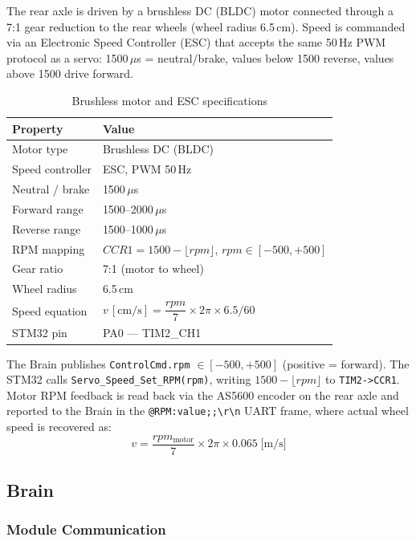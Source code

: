 \documentclass[12pt,a4paper]{article}
\begin{document}
The rear axle is driven by a brushless DC (BLDC) motor connected through a
7:1 gear reduction to the rear wheels (wheel radius 6.5\,cm).
Speed is commanded via an Electronic Speed Controller (ESC) that accepts the same
50\,Hz PWM protocol as a servo: 1500\,\(\mu\)s = neutral/brake, values below 1500 reverse,
values above 1500 drive forward.

\begin{table}[H]
\centering
\begin{tabular}{ll}
\hline
\textbf{Property} & \textbf{Value} \\
\hline
Motor type      & Brushless DC (BLDC) \\
Speed controller & ESC, PWM 50\,Hz \\
Neutral / brake  & 1500\,\(\mu\)s \\
Forward range    & 1500--2000\,\(\mu\)s \\
Reverse range    & 1500--1000\,\(\mu\)s \\
RPM mapping     & \(CCR1 = 1500 - \lfloor rpm \rfloor\), \(rpm \in [-500, +500]\) \\
Gear ratio      & 7:1 (motor to wheel) \\
Wheel radius    & 6.5\,cm \\
Speed equation  & \(v\,[\text{cm/s}] = \dfrac{rpm}{7} \times 2\pi \times 6.5 / 60\) \\
STM32 pin       & PA0 — TIM2\_CH1 \\
\hline
\end{tabular}
\caption{Brushless motor and ESC specifications}
\end{table}

The Brain publishes \texttt{ControlCmd.rpm} \(\in [-500, +500]\) (positive = forward).
The STM32 calls \texttt{Servo\_Speed\_Set\_RPM(rpm)}, writing
\(1500 - \lfloor rpm \rfloor\) to \texttt{TIM2->CCR1}.
Motor RPM feedback is read back via the AS5600 encoder on the rear axle and
reported to the Brain in the \texttt{@RPM:value;;\textbackslash r\textbackslash n} UART frame,
where actual wheel speed is recovered as:
\[
  v = \frac{rpm_{\text{motor}}}{7} \times 2\pi \times 0.065 \;\text{[m/s]}
\]

\subsection{Brain}

\subsubsection{Module Communication}
\end{document}
